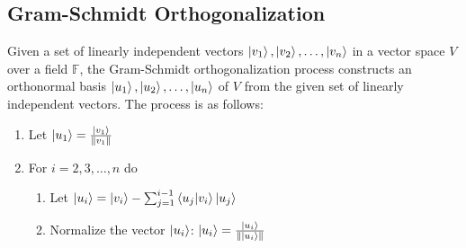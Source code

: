 \subsection{Gram-Schmidt Orthogonalization}
Given a set of linearly independent vectors $\ket{v_1},\ket{v_2},\ldots,\ket{v_n}$ in a vector space $V$ over a field $\mathbb{F}$, the Gram-Schmidt orthogonalization process constructs an orthonormal basis $\ket{u_1},\ket{u_2},\ldots,\ket{u_n}$ of $V$ from the given set of linearly independent vectors. The process is as follows:
\begin{enumerate}
    \item Let $\ket{u_1}=\frac{\ket{v_1}}{\|v_1\|}$
    \item For $i=2,3,\ldots,n$ do
    \begin{enumerate}
        \item Let $\ket{u_i}=\ket{v_i}-\sum_{j=1}^{i-1}\braket{u_j|v_i}\ket{u_j}$
        \item Normalize the vector $\ket{u_i}$: $\ket{u_i}=\frac{\ket{u_i}}{\|\ket{u_i}\|}$
    \end{enumerate}
\end{enumerate}

